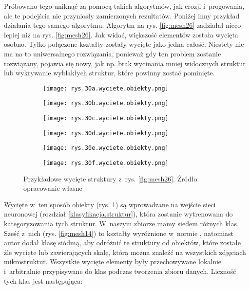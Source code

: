 Próbowano tego uniknąć za pomocą takich algorytmów, jak erozji i~progowania, ale te podejścia nie przyniosły zamierzonych rezultatów. Poniżej inny przykład działania tego samego algorytmu.
Algorytm na rys. \ref{fig:mesh26} zadziałał nieco lepiej niż na rys. \ref{fig:mesh26}. Jak widać, większość elementów została wycięta osobno. Tylko połączone kształty zostały wycięte jako jedna całość. Niestety nie ma na to uniwersalnego rozwiązania, ponieważ gdy ten problem zostanie rozwiązany, pojawia się nowy, jak np. brak wycinania mniej widocznych struktur lub wykrywanie wyblakłych struktur, które powinny zostać pominięte.
\begin{figure}[h]
	\centering
	\begin{subfigure}{0.29\textwidth}
	    \centering
	    \texttt{[image: rys.30a.wyciete.obiekty.png]}
	\end{subfigure}
	\begin{subfigure}{0.29\textwidth}
	    \centering
	    \texttt{[image: rys.30b.wyciete.obiekty.png]}
	\end{subfigure}
	\begin{subfigure}{0.29\textwidth}
	    \centering
	    \texttt{[image: rys.30c.wyciete.obiekty.png]}
	\end{subfigure}
	\begin{subfigure}{0.29\textwidth}
	    \centering
	    \texttt{[image: rys.30d.wyciete.obiekty.png]}
	\end{subfigure}
	\begin{subfigure}{0.29\textwidth}
	    \centering
	    \texttt{[image: rys.30e.wyciete.obiekty.png]}
	\end{subfigure}
	\begin{subfigure}{0.29\textwidth}
	    \centering
	    \texttt{[image: rys.30f.wyciete.obiekty.png]}
	\end{subfigure}
	\caption{\label{fig:mesh28}Przykładowe wycięte struktury z~rys. \ref{fig:mesh26}. Źródło: opracowanie własne}
\end{figure}
Wycięte w~ten sposób obiekty (rys. \ref{fig:mesh28}) są wprowadzane na wejście sieci neuronowej (rozdział \ref{klasyfikacja.struktur}), która zostanie wytrenowana do kategoryzowania tych struktur. W~naszym zbiorze mamy siedem różnych klas. Sześć z~nich (rys. \ref{fig:mesh14}) to kształty wyróżnione w~normie \cite{norma}, natomiast autor dodał klasę siódmą, aby odróżnić te struktury od obiektów, które zostałe źle wycięte lub zawierających skalę, którą można znaleźć na wszystkich zdjęciach mikrostruktur. Wszystkie wycięte elementy były przechowywane lokalnie i~arbitralnie przypisywane do klas podczas tworzenia zbioru danych. Liczność tych klas jest następująca:
